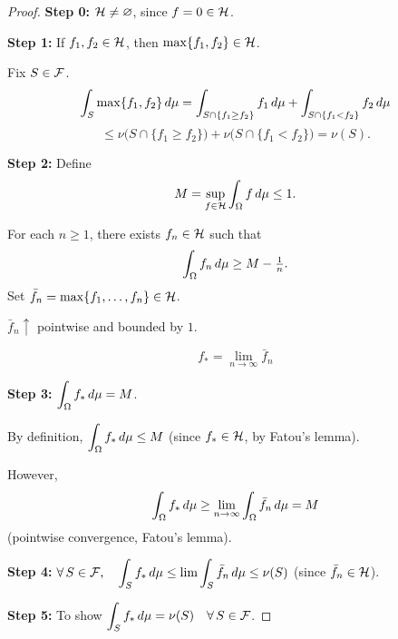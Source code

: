\begin{proof}
    \textbf{Step 0:} $\mathcal{H} \neq \varnothing$, since $f = 0 \in \mathcal{H}$.

    \medskip
    \textbf{Step 1:} If $f_1, f_2 \in \mathcal{H}$, then $\max\{f_1, f_2\} \in \mathcal{H}$.

    Fix $S \in \mathcal{F}$.
    \[
        \int_S \max\{f_1, f_2\} \,d\mu
        = \int_{S \cap \{f_1 \geq f_2\}} f_1 \,d\mu + \int_{S \cap \{f_1 < f_2\}} f_2 \,d\mu
    \]
    \[
        \leq \nu\bigl(S \cap \{f_1 \geq f_2\}\bigr) + \nu\bigl(S \cap \{f_1 < f_2\}\bigr)
        = \nu(S).
    \]

    \medskip
    \textbf{Step 2:} Define
    \[
        M = \sup_{f \in \mathcal{H}} \int_\Omega f \,d\mu \leq 1.
    \]

    For each $n \geq 1$, there exists $f_n \in \mathcal{H}$ such that
    \[
        \int_\Omega f_n \,d\mu \geq M - \tfrac{1}{n}.
    \]
    Set $\bar{f}_n = \max\{f_1, \ldots, f_n\} \in \mathcal{H}$.

    $\bar{f}_n \uparrow$ pointwise and bounded by $1$.

    \medskip
    \[
        \boxed{f_* = \lim_{n \to \infty} \bar{f}_n}
    \]

    \medskip
    \textbf{Step 3:} $\displaystyle\int_\Omega f_* \,d\mu = M$.

    By definition, $\displaystyle\int_\Omega f_* \,d\mu \leq M$ (since $f_* \in \mathcal{H}$, by Fatou's lemma).

    However,
    \[
        \int_\Omega f_* \,d\mu \geq \lim_{n \to \infty} \int_\Omega \bar{f}_n \,d\mu = M
    \]
    (pointwise convergence, Fatou's lemma).

    \medskip
    \textbf{Step 4:} $\displaystyle\forall\, S \in \mathcal{F}, \quad \int_S f_* \,d\mu \leq \lim \int_S \bar{f}_n \,d\mu \leq \nu(S)$ \quad (since $\bar{f}_n \in \mathcal{H}$).

    \medskip
    \textbf{Step 5:} To show $\displaystyle\int_S f_* \,d\mu = \nu(S) \quad \forall\, S \in \mathcal{F}$.
\end{proof}
